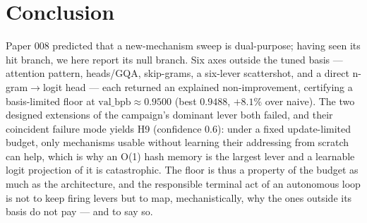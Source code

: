 \documentclass{article}
\newcommand{\valbpb}{\mathrm{val\_bpb}}
\begin{document}
\section{Conclusion}
\label{sec:conclusion}

Paper 008 predicted that a new-mechanism sweep is dual-purpose; having seen its hit branch, we here report its null branch. Six axes outside the tuned basis --- attention pattern, heads/GQA, skip-grams, a six-lever scattershot, and a direct n-gram$\to$logit head --- each returned an explained non-improvement, certifying a basis-limited floor at $\valbpb\approx0.9500$ (best $0.9488$, $+8.1\%$ over naive). The two designed extensions of the campaign's dominant lever both failed, and their coincident failure mode yields H9 (confidence $0.6$): under a fixed update-limited budget, only mechanisms usable without learning their addressing from scratch can help, which is why an O(1) hash memory is the largest lever and a learnable logit projection of it is catastrophic. The floor is thus a property of the budget as much as the architecture, and the responsible terminal act of an autonomous loop is not to keep firing levers but to map, mechanistically, why the ones outside its basis do not pay --- and to say so.


\end{document}
